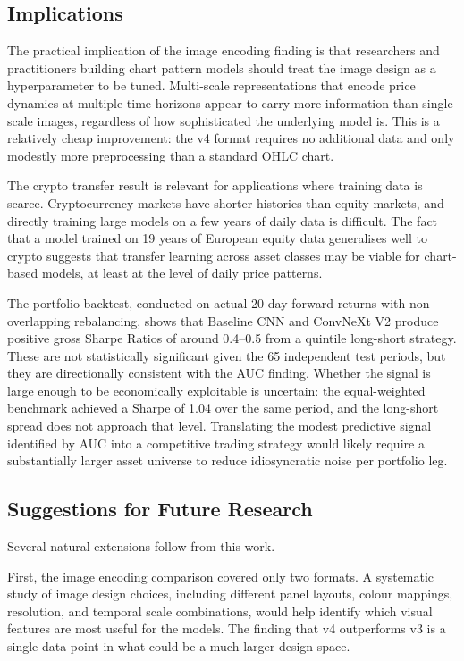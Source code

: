 \subsection{Implications}

The practical implication of the image encoding finding is that researchers and practitioners building chart pattern models should treat the image design as a hyperparameter to be tuned. Multi-scale representations that encode price dynamics at multiple time horizons appear to carry more information than single-scale images, regardless of how sophisticated the underlying model is. This is a relatively cheap improvement: the v4 format requires no additional data and only modestly more preprocessing than a standard OHLC chart.

The crypto transfer result is relevant for applications where training data is scarce. Cryptocurrency markets have shorter histories than equity markets, and directly training large models on a few years of daily data is difficult. The fact that a model trained on 19 years of European equity data generalises well to crypto suggests that transfer learning across asset classes may be viable for chart-based models, at least at the level of daily price patterns.

The portfolio backtest, conducted on actual 20-day forward returns with non-overlapping rebalancing, shows that Baseline CNN and ConvNeXt V2 produce positive gross Sharpe Ratios of around 0.4--0.5 from a quintile long-short strategy. These are not statistically significant given the 65 independent test periods, but they are directionally consistent with the AUC finding. Whether the signal is large enough to be economically exploitable is uncertain: the equal-weighted benchmark achieved a Sharpe of 1.04 over the same period, and the long-short spread does not approach that level. Translating the modest predictive signal identified by AUC into a competitive trading strategy would likely require a substantially larger asset universe to reduce idiosyncratic noise per portfolio leg.

\subsection{Suggestions for Future Research}

Several natural extensions follow from this work.

First, the image encoding comparison covered only two formats. A systematic study of image design choices, including different panel layouts, colour mappings, resolution, and temporal scale combinations, would help identify which visual features are most useful for the models. The finding that v4 outperforms v3 is a single data point in what could be a much larger design space.

